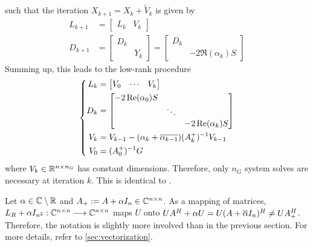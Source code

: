 such that the iteration $X_{k+1} = X_k + \tilde V_k$ is given by
\begin{align*}
  L_{k+1} &= \begin{bmatrix}
    L_k &
    V_k
  \end{bmatrix} \\
    D_{k+1} &= \begin{bmatrix}
      D_k \\
      & Y_k
    \end{bmatrix}
    = \begin{bmatrix}
      D_k \\
      & -2\Re(\alpha_k) S
    \end{bmatrix}
\end{align*}
Summing up,
this leads to the low-rank procedure
\begin{equation}
\left\{
\begin{aligned}
  L_k &= \begin{bmatrix}
    V_0 &
    \cdots &
    V_k
  \end{bmatrix} \\
  D_k &= \begin{bmatrix}
    -2 \Re(\alpha_0) S \\
    & \ddots \\
    && -2 \Re(\alpha_k) S
  \end{bmatrix} \\
  V_k &= V_{k-1} - (\alpha_k + \conj{\alpha_{k-1}}) (A_k^+)^{-1} V_{k-1} \\
  V_0 &= (A_0^+)^{-1} G
\end{aligned}
\right.
\end{equation}
where $V_k \in\mathbb{R}^{n\times n_G}$ has constant dimensions.
Therefore, only $n_G$ system solves are necessary at iteration $k$.
This is identical to \cite[Equation~(2.30)]{Lang2017}.



\begin{remark}
  Let $\alpha\in\mathbb{C}\setminus\mathbb{R}$ and $A_+ := A+\alpha I_n \in\mathbb{C}^{n\times n}$.
  As a mapping of matrices,
  $L_R + \alpha I_{n^2} : \mathbb{C}^{n\times n} \longrightarrow \mathbb{C}^{n\times n}$ maps $U$ onto
  $
    U A^\HT + \alpha U =
    U(A+\conj{\alpha} I_n)^\HT \neq
    U A_+^\HT
  $.
  Therefore, the notation is slightly more involved than in the previous section.
  For more details, refer to \autoref{sec:vectorization}.
\end{remark}

